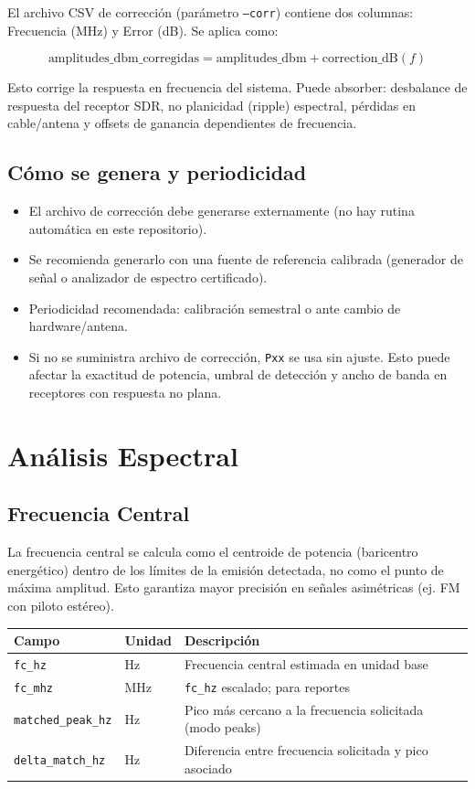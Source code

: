 El archivo CSV de corrección (parámetro \texttt{--corr}) contiene dos columnas: Frecuencia (MHz) y Error (dB). Se aplica como:

\begin{displaymath}
\text{amplitudes\_dbm\_corregidas} = \text{amplitudes\_dbm} + \text{correction\_dB}(f)
\end{displaymath}

Esto corrige la respuesta en frecuencia del sistema. Puede absorber: desbalance de respuesta del receptor SDR, no planicidad (ripple) espectral, pérdidas en cable/antena y offsets de ganancia dependientes de frecuencia.

\subsection{Cómo se genera y periodicidad}

\begin{itemize}
\item El archivo de corrección debe generarse externamente (no hay rutina automática en este repositorio).
\item Se recomienda generarlo con una fuente de referencia calibrada (generador de señal o analizador de espectro certificado).
\item Periodicidad recomendada: calibración semestral o ante cambio de hardware/antena.
\item Si no se suministra archivo de corrección, \texttt{Pxx} se usa sin ajuste. Esto puede afectar la exactitud de potencia, umbral de detección y ancho de banda en receptores con respuesta no plana.
\end{itemize}

\section{Análisis Espectral}

\subsection{Frecuencia Central}

La frecuencia central se calcula como el centroide de potencia (baricentro energético) dentro de los límites de la emisión detectada, no como el punto de máxima amplitud. Esto garantiza mayor precisión en señales asimétricas (ej. FM con piloto estéreo).

\begin{tabular}{p{4cm}p{3cm}p{7cm}}
\textbf{Campo} & \textbf{Unidad} & \textbf{Descripción} \\
\hline
\texttt{fc\_hz} & Hz & Frecuencia central estimada en unidad base \\
\texttt{fc\_mhz} & MHz & \texttt{fc\_hz} escalado; para reportes \\
\texttt{matched\_peak\_hz} & Hz & Pico más cercano a la frecuencia solicitada (modo peaks) \\
\texttt{delta\_match\_hz} & Hz & Diferencia entre frecuencia solicitada y pico asociado \\
\end{tabular}


